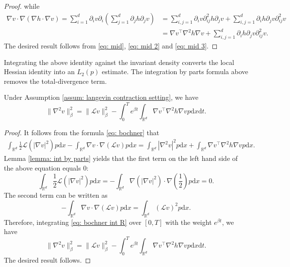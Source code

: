 \documentclass[twoside,11pt]{article}
\newcommand{\dd}{\mathrm{d}}
\newcommand{\R}{\mathbb{R}}
\newcommand{\1}{\mathbf{1}}
\newcommand{\cL}{\mathcal{L}}
\numberwithin{equation}{section}
\begin{document}
\begin{proof}
while
\begin{equation}\label{eq: mid 3}
    \begin{aligned}
        \nabla v \cdot \nabla(\nabla h \cdot \nabla v) = \sum_{i=1}^d \partial_i v \partial_i(\sum_{j=1}^d \partial_j h\partial_j v) &= \sum_{i,j=1}^d \partial_i v  \partial_{ij}^2 h \partial_j v + \sum_{i,j=1}^d \partial_i h \partial_j v \partial_{ij}^2 v\\
        & = \nabla v^{\top} \nabla^2 h \nabla v+ \sum_{i,j=1}^d \partial_i h \partial_j v \partial_{ij}^2 v.
    \end{aligned}
\end{equation}
The desired result follows from \eqref{eq: mid}, \eqref{eq: mid 2} and \eqref{eq: mid 3}.
\end{proof}

Integrating the above identity against the invariant density converts the local Hessian identity into an $L_2(p)$ estimate. The integration by parts formula above removes the total-divergence term.

\begin{lemma}\label{lemma: hessian bound mid}
    Under Assumption \ref{assum: langevin contraction setting}, we have
    \begin{equation}
        \|\nabla^2 v\|_{\beta}^2 = \|\cL v\|_{\beta}^2 - \int_{0}^T e^{\beta t} \int_{\R^d} \nabla v^{\top} \nabla^2 h\nabla v p \dd x\dd t.
    \end{equation}
\end{lemma}
\begin{proof}
    It follows from the formula \eqref{eq: bochner} that
    \begin{equation}\label{eq: bochner int R}
        \begin{aligned}
            \int_{\R^d} \frac{1}{2} \cL(|\nabla v|^2) p\dd x - \int_{\R^d} \nabla v\cdot \nabla(\cL v) p \dd x = \int_{\R^d} |\nabla^2 v|^2 p \dd x + \int_{\R^d}\nabla v^{\top}\nabla^2 h\nabla v p\dd x.
        \end{aligned}
    \end{equation}
    Lemma \ref{lemma: int by parts} yields that the first term on the left hand side of the above equation equals $ 0$:
    \begin{equation}
        \int_{\R^d} \frac{1}{2}\cL(|\nabla v|^2) p \dd x = -\int_{\R^d} \nabla (|\nabla v|^2) \cdot \nabla \left(\frac{1}{2}\right) p \dd x = 0.
    \end{equation}
    The second term can be written as
    \begin{equation}
        -\int_{\R^d} \nabla v\cdot \nabla(\cL v) p\dd x = \int_{\R^d}(\cL v)^2 p \dd x.
    \end{equation}
    Therefore, integrating \eqref{eq: bochner int R} over $ [0,T]$ with the weight $ e^{\beta t}$, we have
    \begin{equation}
        \|\nabla^2 v\|_{\beta}^2 = \|\cL v\|_{\beta}^2 - \int_0^T e^{\beta t} \int_{\R^d} \nabla v^{\top}\nabla^2 h\nabla v p\dd x \dd t .
    \end{equation}
    The desired result follows.
\end{proof}
\end{document}
